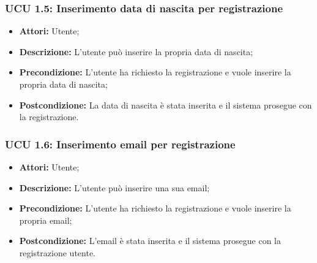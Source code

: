 \hypertarget{U1.5}{}
\subsubsection{UCU 1.5: Inserimento data di nascita per registrazione}
\begin{itemize}
	\item \textbf{Attori:} Utente;
	\item \textbf{Descrizione:} L'utente può inserire la propria data di nascita;
	\item \textbf{Precondizione:} L'utente ha richiesto la registrazione e vuole inserire la propria data di nascita;
	\item \textbf{Postcondizione:} La data di nascita è stata inserita e il sistema prosegue con la registrazione.
\end{itemize}

\hypertarget{U1.6}{}
\subsubsection{UCU 1.6: Inserimento email per registrazione}
\begin{itemize}
	\item \textbf{Attori:} Utente;
	\item \textbf{Descrizione:} L'utente può inserire una sua email;
	\item \textbf{Precondizione:} L'utente ha richiesto la registrazione e vuole inserire la propria email;
\item \textbf{Postcondizione:} L'email è stata inserita e il sistema prosegue con la registrazione utente.
\end{itemize}

\hypertarget{U2}{}
